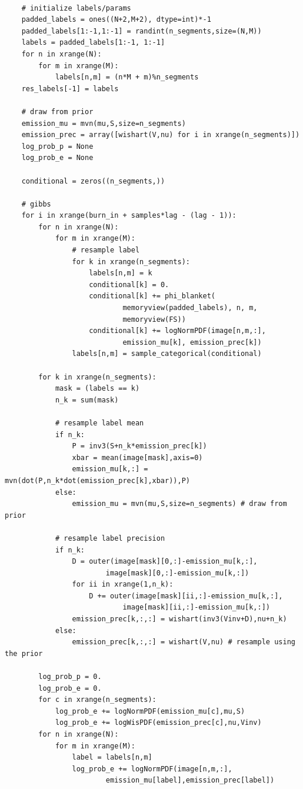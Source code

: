 \documentclass[12pt]{article}
\begin{document}
\begin{verbatim}
    
    # initialize labels/params
    padded_labels = ones((N+2,M+2), dtype=int)*-1
    padded_labels[1:-1,1:-1] = randint(n_segments,size=(N,M))
    labels = padded_labels[1:-1, 1:-1]
    for n in xrange(N):
        for m in xrange(M):
            labels[n,m] = (n*M + m)%n_segments
    res_labels[-1] = labels

    # draw from prior
    emission_mu = mvn(mu,S,size=n_segments) 
    emission_prec = array([wishart(V,nu) for i in xrange(n_segments)])
    log_prob_p = None
    log_prob_e = None

    conditional = zeros((n_segments,))

    # gibbs
    for i in xrange(burn_in + samples*lag - (lag - 1)):
        for n in xrange(N):
            for m in xrange(M):
                # resample label
                for k in xrange(n_segments):
                    labels[n,m] = k
                    conditional[k] = 0.
                    conditional[k] += phi_blanket(
                            memoryview(padded_labels), n, m,
                            memoryview(FS))
                    conditional[k] += logNormPDF(image[n,m,:],
                            emission_mu[k], emission_prec[k])
                labels[n,m] = sample_categorical(conditional)

        for k in xrange(n_segments):
            mask = (labels == k)
            n_k = sum(mask)
            
            # resample label mean
            if n_k:
                P = inv3(S+n_k*emission_prec[k])
                xbar = mean(image[mask],axis=0)
                emission_mu[k,:] = mvn(dot(P,n_k*dot(emission_prec[k],xbar)),P)
            else:
                emission_mu = mvn(mu,S,size=n_segments) # draw from prior

            # resample label precision
            if n_k:
                D = outer(image[mask][0,:]-emission_mu[k,:],
                        image[mask][0,:]-emission_mu[k,:])
                for ii in xrange(1,n_k):
                    D += outer(image[mask][ii,:]-emission_mu[k,:],
                            image[mask][ii,:]-emission_mu[k,:])
                emission_prec[k,:,:] = wishart(inv3(Vinv+D),nu+n_k)
            else:
                emission_prec[k,:,:] = wishart(V,nu) # resample using the prior

        log_prob_p = 0.
        log_prob_e = 0.
        for c in xrange(n_segments):
            log_prob_e += logNormPDF(emission_mu[c],mu,S)
            log_prob_e += logWisPDF(emission_prec[c],nu,Vinv)
        for n in xrange(N):
            for m in xrange(M):
                label = labels[n,m]
                log_prob_e += logNormPDF(image[n,m,:],
                        emission_mu[label],emission_prec[label])


\end{verbatim}
\end{document}
